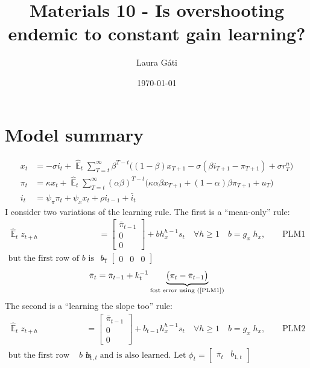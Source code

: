 \documentclass[11pt]{article}
\renewcommand{\[}{\begin{equation}}
\renewcommand{\]}{\end{equation}}
\DeclareMathOperator{\E}{\mathbb{E}}
\begin{document}
\linespread{1.0}

\title{Materials 10 - Is overshooting endemic to constant gain learning?}
\author{Laura G\'ati} 
\date{\today}
\maketitle


\tableofcontents




\newpage
\section{Model summary}
\begin{align}
x_t &=  -\sigma i_t +\hat{\E}_t \sum_{T=t}^{\infty} \beta^{T-t }\big( (1-\beta)x_{T+1} - \sigma(\beta i_{T+1} - \pi_{T+1}) +\sigma r_T^n \big)  \label{prestons18}  \\
\pi_t &= \kappa x_t +\hat{\E}_t \sum_{T=t}^{\infty} (\alpha\beta)^{T-t }\big( \kappa \alpha \beta x_{T+1} + (1-\alpha)\beta \pi_{T+1} + u_T\big) \label{prestons19}  \\
i_t &= \psi_{\pi}\pi_t + \psi_{x} x_t  + \rho i_{t-1} + \bar{i}_t \label{TR}
\end{align}
 I consider two variations of the learning rule. The first is a ``mean-only'' rule:
\begin{align}
\hat{\E}_t z_{t+h} & =  \begin{bmatrix}\bar{\pi}_{t-1} \\ 0 \\ 0 \end{bmatrix}+ bh_x^{h-1}s_t  \quad \forall h\geq 1 \quad b = g_x \; h_x ,\quad \quad  \text{PLM1} \label{PLM1} \\
 \text{but the first row of $b$ is } \quad b_1 & = \begin{bmatrix} 0& 0&0 \end{bmatrix}
 \end{align}
\begin{equation}
\bar{\pi}_{t} = \bar{\pi}_{t-1} +k_t^{-1}\underbrace{\big(\pi_{t} - \bar{\pi}_{t-1} \big)}_{\text{fcst error using (\ref{PLM1})} }  
\end{equation}
The second is a ``learning the slope too'' rule:
\begin{align}
\hat{\E}_t z_{t+h} & =  \begin{bmatrix}\bar{\pi}_{t-1} \\ 0 \\ 0 \end{bmatrix}+ b_{t-1}h_x^{h-1}s_t  \quad \forall h\geq 1 \quad b = g_x \; h_x ,\quad \quad  \text{PLM2} \label{PLM2} \\
 \text{but the first row of $b$ is } &b_{1,t} \; \text{and is also learned. Let} \; \phi_t = \begin{bmatrix} \bar{\pi}_{t}& b_{1,t} 
 \end{bmatrix}
 \end{align}
\end{document}
